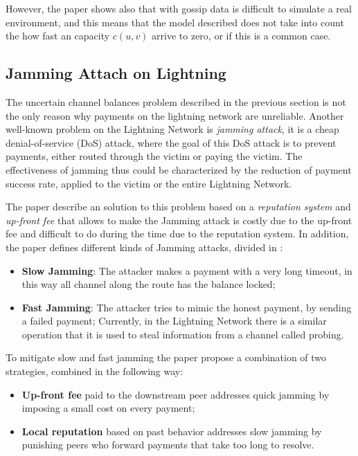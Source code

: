 However, the paper shows also that with gossip data is difficult to simulate 
a real environment, and this means that the model described does not take into 
count the how fast an capacity $c(u, v)$ arrive to zero, or if this is a 
common case.

\subsection{Jamming Attach on Lightning}
\label{sec:jamming}

The uncertain channel balances problem described in the previous section 
is not the only reason why payments on the lightning network are unreliable.
Another well-known problem on the Lightning Network is \emph{jamming attack},
it is a cheap denial-of-service (DoS) attack, where the goal of this DoS attack 
is to prevent payments, either routed through the victim or paying the victim. 
The effectiveness of jamming thus could be characterized by the reduction of 
payment success rate, applied to the victim or the entire Lightning Network.

The paper \cite{cryptoeprint:2022/1454} describe an solution to this problem 
based on a \emph{reputation system} and \emph{up-front fee} that allows to make
the Jamming attack is costly due to the up-front fee and difficult to do during the time 
due to the reputation system.
In addition, the paper defines different kinds of Jamming attacks, divided in :

\begin{itemize}
    \item {\bf Slow Jamming}: The attacker makes a payment with a very long timeout, 
        in this way all channel along the route has the balance locked;
    \item {\bf Fast Jamming}: The attacker tries to mimic the honest payment, by sending
        a failed payment; Currently, in the Lightning Network there is a similar operation
        that it is used to steal information from a channel called probing.
\end{itemize}

To mitigate slow and fast jamming the paper \cite{cryptoeprint:2022/1454}
propose a combination of two strategies, combined in the following way:

\begin{itemize}
    \item {\bf Up-front fee} paid to the downstream peer addresses quick jamming 
        by imposing a small cost on every payment;
    \item {\bf Local reputation} based on past behavior addresses slow jamming by 
        punishing peers who forward payments that take too long to resolve.
\end{itemize}

